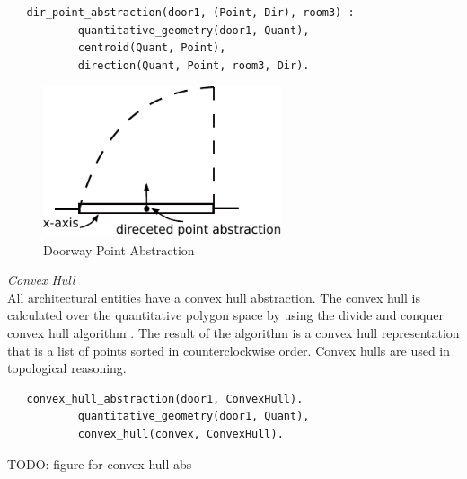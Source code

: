 \documentclass[12pt]{ucthesis}
\begin{document}
\begin{verbatim}
   dir_point_abstraction(door1, (Point, Dir), room3) :-
           quantitative_geometry(door1, Quant),
           centroid(Quant, Point),
           direction(Quant, Point, room3, Dir).
\end{verbatim}

\begin{figure}[H]\label{dir-point-abs}
\centering
\includegraphics[width=70mm]{dir-point-abs}
\caption{Doorway Point Abstraction}
\end{figure}

\noindent \emph{\large Convex Hull} \\
\indent All architectural entities have a convex hull abstraction. The convex hull is calculated over the quantitative polygon space by using the divide and conquer convex hull algorithm \cite{tbd}. The result of the algorithm is a convex hull representation that is a list of points sorted in counterclockwise order. Convex hulls are used in topological reasoning.
\begin{verbatim}
   convex_hull_abstraction(door1, ConvexHull).
           quantitative_geometry(door1, Quant),
           convex_hull(convex, ConvexHull).
\end{verbatim}

TODO: figure for convex hull abs


\clearpage


%

%
%

\end{document}
